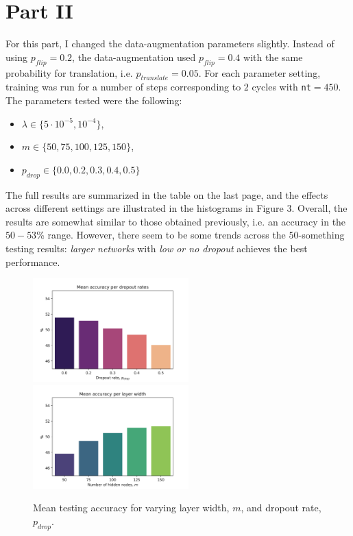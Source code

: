 \documentclass{article}
\begin{document}
\section*{Part II}
	For this part, I changed the data-augmentation parameters slightly. Instead of using $p_{flip} = 0.2$, the data-augmentation used $p_{flip} = 0.4$ with the same probability for translation, i.e. $p_{translate} = 0.05$. For each parameter setting, training was run for a number of steps corresponding to $2$ cycles with \texttt{nt}$=450$. The parameters tested were the following:
	\begin{itemize}
		\item $\lambda \in \{5\cdot10^{-5}, 10^{-4}\}$, 
		\item $m \in \{50, 75, 100, 125, 150\}$,
		\item $p_{drop} \in \{0.0, 0.2, 0.3, 0.4, 0.5\}$
	\end{itemize}
	\vspace{0.2cm}
	The full results are summarized in the table on the last page, and the effects across different settings are illustrated in the histograms in Figure $3$. Overall, the results are somewhat similar to those obtained previously, i.e. an accuracy in the $50-53$\% range. However, there seem to be some trends across the $50$-something testing results: \textit{larger networks} with \textit{low or no dropout} achieves the best performance.\\
	\begin{figure}[!h]
		\centering
		\includegraphics[width=6cm]{../plots/compDropout.png}
		\includegraphics[width=6cm]{../plots/compLayerM.png}
		\caption{Mean testing accuracy for varying layer width, $m$, and dropout rate, $p_{drop}$.}
	\end{figure}\\
\end{document}
